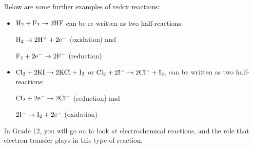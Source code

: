 Below are some further examples of redox reactions:

\begin{itemize}
\item{$\rm{H_{2} + F_{2} \rightarrow 2HF}$ can be re-written as two half-reactions:
\begin{center}
$\rm{H_{2} \rightarrow 2H^{+} + 2e^{-}}$ (oxidation) and

$\rm{F_{2} + 2e^{-} \rightarrow 2F^{-}}$ (reduction)
\end{center}
}

\item{$\rm{Cl_{2} + 2KI \rightarrow 2KCl + I_{2}}$ or $\rm{Cl_{2} + 2I^{-} \rightarrow 2Cl^{-} + I_{2}}$, can be written as two half-reactions:
\begin{center}
$\rm{Cl_{2} + 2e^{-} \rightarrow 2Cl^{-}}$ (reduction) and

$\rm{2I^{-} \rightarrow I_{2} + 2e^{-}}$ (oxidation)
\end{center}
}
\end{itemize}

In Grade 12, you will go on to look at electrochemical reactions, and the role that electron transfer plays in this type of reaction.\\

